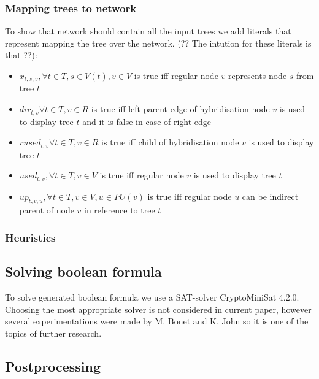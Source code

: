 \documentclass[runningheads, envcountsame, a4paper]{llncs}
\begin{document}
\subsubsection{Mapping trees to network}

To show that network should contain all the input trees we add literals that represent mapping the tree over the network. (?? The intution for these literals is that ??):

\begin{itemize}

\item $x_{t,s,v}, \forall t \in T, s \in V(t), v \in V$ is true iff regular node $v$ represents node $s$ from tree $t$

\item $dir_{t,v} \forall t \in T, v \in R$ is true iff left parent edge of hybridisation node $v$ is used to display tree $t$ and it is false in case of right edge

\item $rused_{t,v} \forall t \in T, v \in R$ is true iff child of hybridisation node $v$ is used to display tree $t$

\item $used_{t,v}, \forall t \in T, v \in V$ is true iff regular node $v$ is used to display tree $t$

\item $up_{t,v,u}, \forall t \in T, v \in V, u \in PU(v)$ is true iff regular node $u$ can be indirect parent of node $v$ in reference to tree $t$

\end{itemize}

\subsubsection{Heuristics}

\subsection{Solving boolean formula}

To solve generated boolean formula we use a SAT-solver CryptoMiniSat 4.2.0. Choosing the most appropriate solver is not considered in current paper, however several experimentations were made by M. Bonet and K. John \cite {Efficiently Calculating Evolutionary Tree Measures Using SAT Maria Luisa Bonet and Katherine St. John} so it is one of the topics of further research.

\subsection{Postprocessing}
\end{document}
